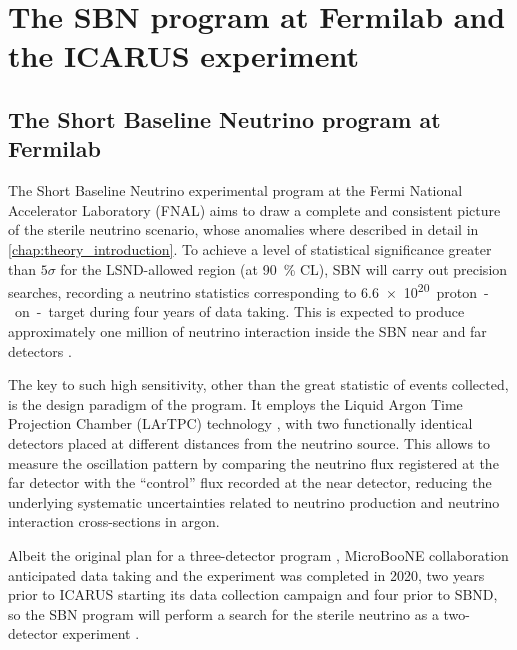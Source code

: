 
\chapter{The SBN program at Fermilab and the ICARUS experiment}
\label{chap:icarus_detector}

\section{The Short Baseline Neutrino program at Fermilab}
The Short Baseline Neutrino experimental program at the Fermi National Accelerator Laboratory (FNAL) aims to  draw a complete and consistent picture of the sterile neutrino scenario, whose anomalies where described in detail in \autoref{chap:theory_introduction}. 
To achieve a level of statistical significance greater than $5\sigma$ for the LSND-allowed region (at \SI{90}{\percent} CL), SBN will carry out precision searches, recording a neutrino statistics corresponding to \SI{6.6e20}{proton-on-target} during four years of data taking. This is expected to produce approximately one million of neutrino interaction inside the SBN near and far detectors \cite{acciarriProposalThreeDetector2015}. 

The key to such high sensitivity, other than the great statistic of events collected, is the design paradigm of the program. It employs the Liquid Argon Time Projection Chamber (LArTPC) technology \cite{rubbiaLiquidArgonTime1977}, with two functionally identical detectors placed at different distances from the neutrino source. This allows to measure the oscillation pattern by comparing the neutrino flux registered at the far detector with the ``control'' flux recorded at the near detector, reducing the underlying systematic uncertainties related to neutrino production and neutrino interaction cross-sections in argon. 

Albeit the original plan for a three-detector program \cite{acciarriProposalThreeDetector2015}, MicroBooNE collaboration anticipated data taking and the experiment was completed in 2020, two years prior to ICARUS starting its data collection campaign and four prior to SBND, so the SBN program will perform a search for the sterile neutrino as a two-detector experiment \cite{acciarriProposalThreeDetector2015, machadoShortBaselineNeutrinoProgram2019}. 

